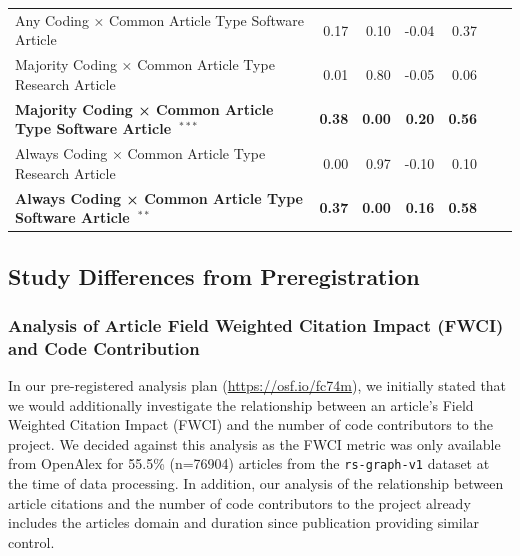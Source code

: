 \documentclass[
  letterpaper,
  DIV=11,
  numbers=noendperiod]{scrartcl}
\begin{document}
\begin{table}
{{\begin{tabular}{l*{6}{r}}
    \cellcolor{white}Any Coding × Common Article Type Software Article & \cellcolor{white}0.17 & \cellcolor{white}0.10 & \cellcolor{white}-0.04 & \cellcolor{white}0.37 \\
    \cellcolor{gray!10}Majority Coding × Common Article Type Research Article & \cellcolor{gray!10}0.01 & \cellcolor{gray!10}0.80 & \cellcolor{gray!10}-0.05 & \cellcolor{gray!10}0.06 \\
    \bfseries\cellcolor{white}Majority Coding × Common Article Type Software Article~$^{***}$ & \bfseries\cellcolor{white}0.38 & \bfseries\cellcolor{white}0.00 & \bfseries\cellcolor{white}0.20 & \bfseries\cellcolor{white}0.56 \\
    \cellcolor{gray!10}Always Coding × Common Article Type Research Article & \cellcolor{gray!10}0.00 & \cellcolor{gray!10}0.97 & \cellcolor{gray!10}-0.10 & \cellcolor{gray!10}0.10 \\
    \bfseries\cellcolor{white}Always Coding × Common Article Type Software Article~$^{**}$ & \bfseries\cellcolor{white}0.37 & \bfseries\cellcolor{white}0.00 & \bfseries\cellcolor{white}0.16 & \bfseries\cellcolor{white}0.58 \\
\bottomrule
\end{tabular}
}

}

\end{table}%

\subsection{Study Differences from
Preregistration}\label{study-differences-from-preregistration}

\subsubsection{Analysis of Article Field Weighted Citation Impact (FWCI)
and Code
Contribution}\label{analysis-of-article-field-weighted-citation-impact-fwci-and-code-contribution}

In our pre-registered analysis plan (\url{https://osf.io/fc74m}), we
initially stated that we would additionally investigate the relationship
between an article's Field Weighted Citation Impact (FWCI) and the
number of code contributors to the project. We decided against this
analysis as the FWCI metric was only available from OpenAlex for 55.5\%
(n=76904) articles from the \texttt{rs-graph-v1} dataset at the time of
data processing. In addition, our analysis of the relationship between
article citations and the number of code contributors to the project
already includes the articles domain and duration since publication
providing similar control.
\end{document}
